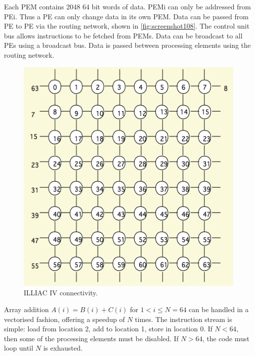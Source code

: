 Each PEM contains 2048 64 bit words of data. PEMi can only be addressed from PEi. Thus a PE can only change data in its own PEM. Data can be passed from PE to PE via the routing network, shown in \autoref{fig:screenshot108}. The control unit bus allows instructions to be fetched from PEMs. Data can be broadcast to all PEs using a broadcast bus. Data is passed between processing elements using the routing network. 

\begin{figure}
\centering
\includegraphics[width=0.7\linewidth]{figures/screenshot108}
\caption{ILLIAC IV connectivity.}
\label{fig:screenshot108}
\end{figure}

Array addition $A(i) = B(i) + C(i)$ for $1 < i \le N = 64$ can be handled in a vectorised fashion, offering a speedup of $N$ times. The instruction stream is simple: load from location 2, add to location 1, store in location 0. If $N < 64$, then some of the processing elements must be disabled. If $N > 64$, the code must loop until $N$ is exhausted.

